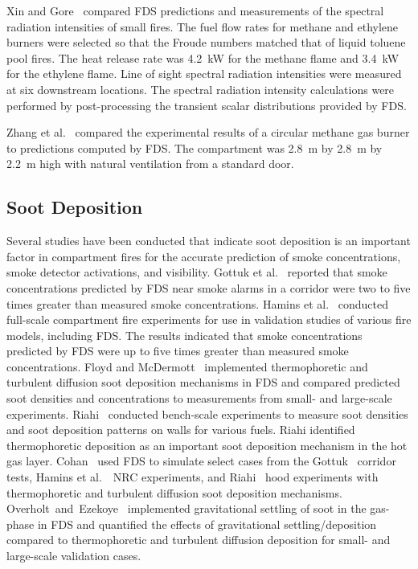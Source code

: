 Xin  and Gore~\cite{Xin:JSS2003}  compared  FDS predictions  and measurements of the spectral radiation intensities of small fires. The fuel flow rates for methane and ethylene burners were selected so that the Froude numbers matched that of liquid toluene pool fires. The heat release rate was 4.2~kW for the methane flame and 3.4~kW for the ethylene flame. Line of sight spectral radiation intensities were measured at six downstream locations.  The spectral radiation intensity calculations were performed by post-processing the transient scalar distributions provided by FDS.

Zhang et al.~\cite{Zhang:1} compared the experimental results of a circular methane gas burner to predictions computed by FDS. The compartment was 2.8~m by 2.8~m by 2.2~m high with natural ventilation from a standard door.




\subsection{Soot Deposition}

Several studies have been conducted that indicate soot deposition is an important factor in compartment fires
for the accurate prediction of smoke concentrations, smoke detector activations, and visibility.
Gottuk et al.~\cite{Gottuk:IAFSS2008} reported that smoke concentrations predicted by FDS near smoke alarms in a
corridor were two to five times greater than measured smoke concentrations. Hamins et al.~\cite{Hamins:SP1013-1}
conducted full-scale compartment fire experiments for use in validation studies of various fire models, including FDS.
The results indicated that smoke concentrations predicted by FDS were up to five times greater than measured
smoke concentrations. Floyd and McDermott~\cite{Floyd:Interflam2010} implemented thermophoretic and turbulent diffusion soot
deposition mechanisms in FDS and compared predicted soot densities and concentrations to measurements from small- and large-scale
experiments. Riahi~\cite{Riahi:2011} conducted bench-scale experiments to measure soot densities and soot
deposition patterns on walls for various fuels. Riahi identified thermophoretic deposition as an important soot deposition
mechanism in the hot gas layer. Cohan~\cite{Cohan:Masters} used FDS to simulate select cases from the
Gottuk~\cite{Gottuk:IAFSS2008} corridor tests, Hamins et al.~\cite{Hamins:SP1013-1}~NRC experiments, and
Riahi~\cite{Riahi:2011} hood experiments with thermophoretic and turbulent diffusion soot deposition mechanisms.
Overholt~and~Ezekoye~\cite{Overholt:1} implemented gravitational settling of soot in the gas-phase in FDS and quantified
the effects of gravitational settling/deposition compared to thermophoretic and turbulent diffusion deposition for small- and
large-scale validation cases.


